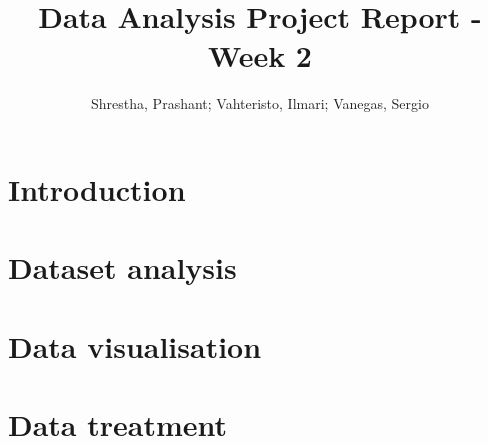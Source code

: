 \documentclass{article}
\title{Data Analysis Project Report - Week 2}
\author{Shrestha, Prashant; Vahteristo, Ilmari; Vanegas, Sergio}
\begin{document}
\maketitle

\section{Introduction} %

\section{Dataset analysis}

\section{Data visualisation}

\section{Data treatment}
\end{document}
